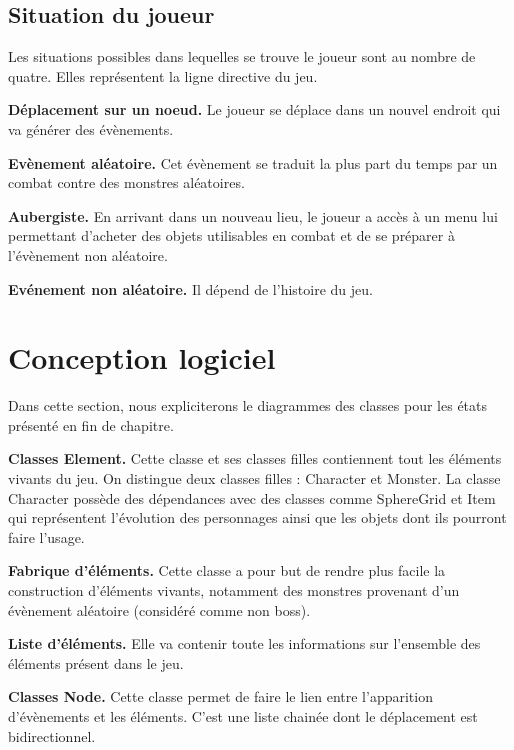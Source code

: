 \documentclass[12pt,a4paper]{report}
\begin{document}
\subsection{Situation du joueur}

Les situations possibles dans lequelles se trouve le joueur sont au nombre de quatre. Elles repr\'{e}sentent la ligne directive du jeu.

\textbf{D\'{e}placement sur un noeud.} Le joueur se d\'{e}place dans un nouvel endroit qui va g\'{e}n\'{e}rer des \'{e}v\`{e}nements. 

\textbf{Ev\`{e}nement al\'{e}atoire.} Cet \'{e}v\`{e}nement se traduit la plus part du temps par un combat contre des monstres al\'{e}atoires.

\textbf{Aubergiste.} En arrivant dans un nouveau lieu, le joueur a acc\`{e}s \`{a} un menu lui permettant d'acheter des objets utilisables en combat et de se pr\'{e}parer \`{a} l'\'{e}v\`{e}nement non al\'{e}atoire.

\textbf{Ev\'{e}nement non al\'{e}atoire.} Il d\'{e}pend de l'histoire du jeu.

\newpage

\section{Conception logiciel}

Dans cette section, nous expliciterons le diagrammes des classes pour les \'{e}tats pr\'{e}sent\'{e} en fin de chapitre. 

\textbf{Classes Element.} Cette classe et ses classes filles contiennent tout les \'{e}l\'{e}ments vivants du jeu. On distingue deux classes filles : Character et Monster. La classe Character possède des dépendances avec des classes comme SphereGrid et Item qui représentent l'\'{e}volution des personnages ainsi que les objets dont ils pourront faire l'usage. 

\textbf{Fabrique d'\'{e}l\'{e}ments.} Cette classe a pour but de rendre plus facile la construction d'\'{e}l\'{e}ments vivants, notamment des monstres provenant d'un \'{e}v\`{e}nement al\'{e}atoire (consid\'{e}r\'{e} comme non boss).

\textbf{Liste d'\'{e}l\'{e}ments.} Elle va contenir toute les informations sur l'ensemble des \'{e}l\'{e}ments pr\'{e}sent dans le jeu. 

\textbf{Classes Node.} Cette classe permet de faire le lien entre l'apparition d'\'{e}v\`{e}nements et les \'{e}l\'{e}ments. C'est une liste chain\'{e}e dont le d\'{e}placement est bidirectionnel. 
\end{document}
